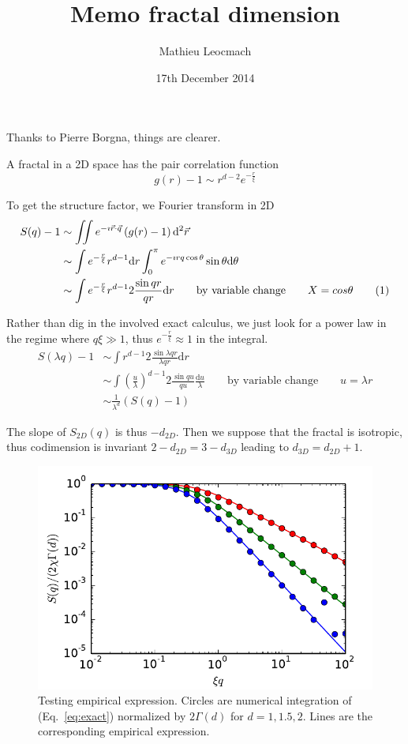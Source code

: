 \documentclass[12pt,a4paper]{article}
\author{Mathieu Leocmach}
\title{Memo fractal dimension}
\date{17th December 2014}
\begin{document}
\maketitle

Thanks to Pierre Borgna, things are clearer.

A fractal in a 2D space has the pair correlation function
\begin{equation}
g(r) -1 \sim r^{d-2} e^{-\frac{r}{\xi}}
\end{equation}

To get the structure factor, we Fourier transform in 2D
\begin{align*}
S(q) -1 &\sim \iint e^{-\imath \vec{r}\cdot\vec{q}} \left(g(r)-1\right) \mathrm{d}^2\vec{r}\\
&\sim \int e^{-\frac{r}{\xi}} r^{d-1} \mathrm{d}r
	\int_0^\pi e^{-\imath rq \cos \theta} \sin\theta \mathrm{d}\theta\\
&\sim \int e^{-\frac{r}{\xi}} r^{d-1} 2\frac{\sin qr}{qr}\mathrm{d}r
\qquad\text{by variable change}\qquad X=cos\theta
\addtocounter{equation}{1}\tag{\theequation}\label{eq:exact}\\
\end{align*}

Rather than dig in the involved exact calculus, we just look for a power law in the regime where $q\xi \gg 1$, thus $e^{-\frac{r}{\xi}} \approx 1$ in the integral.
\begin{align*}
S(\lambda q) -1 &\sim \int r^{d-1} 2\frac{\sin \lambda qr}{\lambda qr}\mathrm{d}r\\
&\sim \int \left(\frac{u}{\lambda}\right)^{d-1} 2\frac{\sin qu}{qu}\frac{\mathrm{d}u}{\lambda} \qquad\text{by variable change}\qquad u=\lambda r\\
&\sim \frac{1}{\lambda^d} \left(S(q) -1\right)
\end{align*}

The slope of $S_{2D}(q)$ is thus $-d_{2D}$. Then we suppose that the fractal is isotropic, thus codimension is invariant $2-d_{2D} = 3-d_{3D}$ leading to $d_{3D} = d_{2D}+1$.

\begin{figure}
\includegraphics{empirical_fractal}
\caption{Testing empirical expression. Circles are numerical integration of (Eq.~\ref{eq:exact}) normalized by $2\Gamma(d)$ for $d=1,1.5,2$. Lines are the corresponding empirical expression.}
\label{fig:empirical}
\end{figure}
\end{document}
